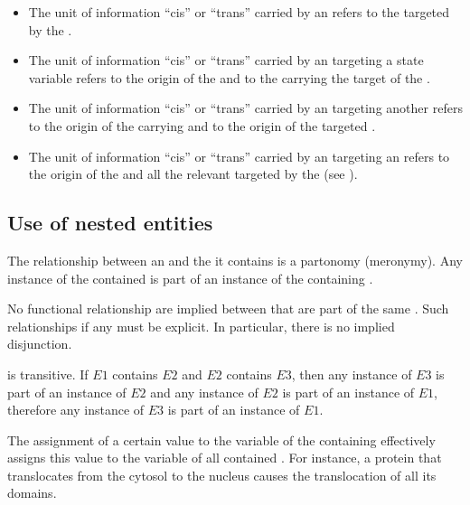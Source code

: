 \begin{itemize}
 \item The unit of information ``cis'' or ``trans'' carried by an  refers to the  targeted by the . 
 \item The unit of information ``cis'' or ``trans'' carried by an  targeting a state variable  refers to the origin of the  and to the  carrying the target of the . 
\item The unit of information ``cis'' or ``trans'' carried by an  targeting another  refers to the origin of the carrying  and to the origin of the targeted .
 \item The unit of information ``cis'' or ``trans'' carried by an  targeting an  refers to the origin of the  and all the relevant  targeted by the  (see ).
\end{itemize}

\subsection{Use of nested entities}\label{sec:semanticsDomain}

\noindent
The relationship between an  and the  it contains is a partonomy (meronymy). Any instance of the contained  is part of an instance of the containing .

\noindent
No functional relationship are implied between  that are part of the same . Such relationships if any must be explicit. In particular, there is no implied disjunction.

\noindent
{} is transitive. If $E1$ contains $E2$ and $E2$ contains $E3$, then any instance of $E3$ is part of an instance of $E2$ and any instance of $E2$ is part of an instance of $E1$, therefore any instance of $E3$ is part of an instance of $E1$.

\noindent
The assignment of a certain value to the variable  of the containing  effectively assigns this value to the variable  of all contained . For instance, a protein that translocates from the cytosol to the nucleus causes the translocation of all its domains.

